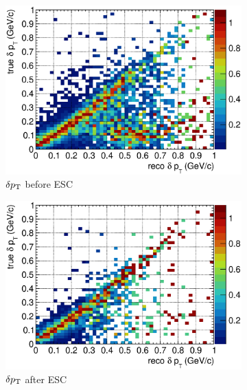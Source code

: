 \begin{figure}
          \begin{subfigure}[b]{\dbfigwid\textwidth}
               \centering
               \includegraphics[width=\textwidth]{figures/perf/tki/dpt_colnor_resmat_al13.eps}
               \caption{$\delta p_\textrm{T}$ before ESC}
               \label{subfig:esc-dpt-bfesc}
          \end{subfigure}
          \begin{subfigure}[b]{\dbfigwid\textwidth}
               \centering
               \includegraphics[width=\textwidth]{figures/perf/tki/dpt_colnor_resmat_al14.eps}
               \caption{$\delta p_\textrm{T}$ after ESC}
               \label{subfig:esc-dpt-afesc}
          \end{subfigure}
          \\
          \begin{subfigure}[b]{\dbfigwid\textwidth}

\end{subfigure}
\end{figure}
